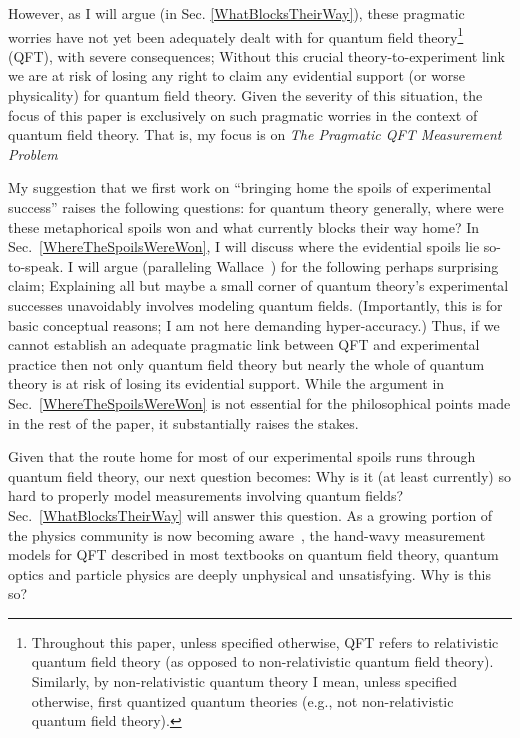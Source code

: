 \documentclass[prd,twocolumn,superscriptaddress,floatfix,amsmath,amssymb,amsfonts,nofootinbib]{revtex4-2}
\begin{document}
However, as I will argue (in Sec. \ref{WhatBlocksTheirWay}), these pragmatic worries have not yet been adequately dealt with for quantum field theory\footnote{Throughout this paper, unless specified otherwise, QFT refers to relativistic quantum field theory (as opposed to non-relativistic quantum field theory). Similarly, by non-relativistic quantum theory I mean, unless specified otherwise, first quantized quantum theories (e.g., not non-relativistic quantum field theory).} (QFT), with severe consequences; Without this crucial theory-to-experiment link we are at risk of losing any right to claim any evidential support (or worse physicality) for quantum field theory. Given the severity of this situation, the focus of this paper is exclusively on such pragmatic worries in the context of quantum field theory. That is, my focus is on \textit{The Pragmatic QFT Measurement Problem}

My suggestion that we first work on ``bringing home the spoils of experimental success'' raises the following questions: for quantum theory generally, where were these metaphorical spoils won and what currently blocks their way home? In Sec.~\ref{WhereTheSpoilsWereWon}, I will discuss where the evidential spoils lie so-to-speak. I will argue (paralleling Wallace~\cite{WallaceBlueSkyTalk,WallaceBlueSkyPaper}) for the following perhaps surprising claim; Explaining all but maybe a small corner of quantum theory's experimental successes unavoidably involves modeling quantum fields. (Importantly, this is for basic conceptual reasons; I am not here demanding hyper-accuracy.) Thus, if we cannot establish an adequate pragmatic link between QFT and experimental practice then not only quantum field theory but nearly the whole of quantum theory is at risk of losing its evidential support. While the argument in Sec.~\ref{WhereTheSpoilsWereWon} is not essential for the philosophical points made in the rest of the paper, it substantially raises the stakes.

Given that the route home for most of our experimental spoils runs through quantum field theory, our next question becomes: Why is it (at least currently) so hard to properly model measurements involving quantum fields? Sec.~\ref{WhatBlocksTheirWay} will answer this question.  As a growing portion of the physics community is now becoming aware~\cite{pologomez2021detectorbased,Jubb2022,BorstenJubbKells,fewster1,fewster2,fewster3,Anastopoulos2022,Sorkin,TaleOfTwo,Ruep2021,JoseMariaEdu,Redhead1995,Dowker,Dowker2,borsten,alvaro,Adam}, the hand-wavy measurement models for QFT described in most textbooks on quantum field theory, quantum optics and particle physics are deeply unphysical and unsatisfying. Why is this so?
\end{document}

